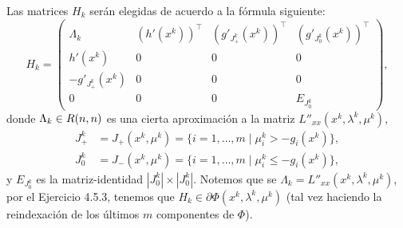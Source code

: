 Las matrices $H_k$ serán elegidas de acuerdo a la fórmula siguiente:
\begin{equation}
    H_k = \begin{pmatrix} \Lambda_k & (h'(x^k))^\top & (g'_{J_+^k}(x^k))^\top & (g'_{J_0^k}(x^k))^\top \\
    h'(x^k) & 0 & 0 & 0 \\
    -g'_{J_+^k}(x^k) & 0 & 0 & 0 \\
    0 & 0 & 0 & E_{J_0^k} \end{pmatrix},
    \label{v2:eq:4.159}
\end{equation}
donde $\Lambda_k \in R(n, n)$ es una cierta aproximación a la matriz $L''_{xx}(x^k, \lambda^k, \mu^k)$,
\begin{align*}
    J_+^k &= J_+(x^k, \mu^k) = \{i = 1, \dots, m \mid \mu_i^k > -g_i(x^k)\}, \\
    J_0^k &= J_-(x^k, \mu^k) = \{i = 1, \dots, m \mid \mu_i^k \le -g_i(x^k)\},
\end{align*}
y $E_{J_0^k}$ es la matriz-identidad $|J_0^k| \times |J_0^k|$.
Notemos que se $\Lambda_k = L''_{xx}(x^k, \lambda^k, \mu^k)$, por el Ejercicio 4.5.3, tenemos que $H_k \in \partial \Phi(x^k, \lambda^k, \mu^k)$ (tal vez haciendo la reindexación de los últimos $m$ componentes de $\Phi$).

